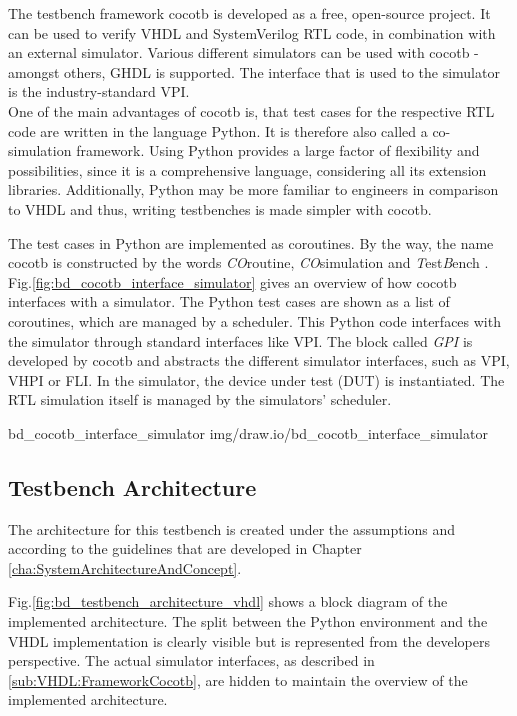 The testbench framework cocotb is developed as a free, open-source project.
It can be used to verify VHDL and SystemVerilog RTL code, in combination with an external simulator.
Various different simulators can be used with cocotb - amongst others, GHDL is supported.
The interface that is used to the simulator is the industry-standard VPI.\\

One of the main advantages of cocotb is, that test cases for the respective RTL code are written in the language Python.
It is therefore also called a co-simulation framework.
Using Python provides a large factor of flexibility and possibilities, since it is a comprehensive language, considering all its extension libraries.
Additionally, Python may be more familiar to engineers in comparison to VHDL and thus, writing testbenches is made simpler with cocotb.

The test cases in Python are implemented as coroutines.
By the way, the name cocotb is constructed by the words \textit{CO}routine, \textit{CO}simulation and \textit{T}est\textit{B}ench \cite{cocotbDoc}.\\

Fig.\ref{fig:bd_cocotb_interface_simulator} gives an overview of how cocotb interfaces with a simulator.
The Python test cases are shown as a list of coroutines, which are managed by a scheduler.
This Python code interfaces with the simulator through standard interfaces like VPI.
The block called \textit{GPI} is developed by cocotb and abstracts the different simulator interfaces, such as VPI, VHPI or FLI.
In the simulator, the device under test (DUT) is instantiated.
The RTL simulation itself is managed by the simulators' scheduler.

 {bd_cocotb_interface_simulator} {img/draw.io/bd_cocotb_interface_simulator}

\subsection{Testbench Architecture}
\label{sub:VHDL:TestbenchArchitecture}

The architecture for this testbench is created under the assumptions and according to the guidelines that are developed in Chapter \ref{cha:SystemArchitectureAndConcept}.

Fig.\ref{fig:bd_testbench_architecture_vhdl} shows a block diagram of the implemented architecture.
The split between the Python environment and the VHDL implementation is clearly visible but is represented from the developers perspective.
The actual simulator interfaces, as described in \ref{sub:VHDL:FrameworkCocotb}, are hidden to maintain the overview of the implemented architecture.\\

